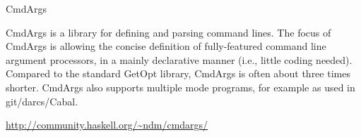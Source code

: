 \begin{hcarentry}{CmdArgs}
\label{cmdargs}
\makeheader

CmdArgs is a library for defining and parsing command lines. The focus of CmdArgs is allowing
the concise definition of fully-featured command line argument processors, in a mainly
declarative manner (i.e., little coding needed). Compared to the standard GetOpt library, CmdArgs
is often about three times shorter. CmdArgs also supports multiple mode programs,
for example as used in git/darcs/Cabal.

\FurtherReading
\url{http://community.haskell.org/~ndm/cmdargs/}
\end{hcarentry}
